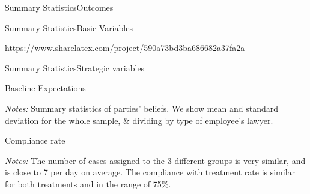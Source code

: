\documentclass[9pt]{beamer}
\begin{document}



\begin{frame}{Summary Statistics}{Outcomes}
  \begin{table}[H]
    \label{Sum_Stats_outcomes}
    \begin{center}
       \tiny{}
    \end{center}
\end{table}
\end{frame}

\begin{frame}{Summary Statistics}{Basic Variables}
  \begin{table}[H]
    \label{Sum_Stats_basic_variables}
    \begin{center}https://www.sharelatex.com/project/590a73bd3ba686682a37fa2a
       \tiny{}
    \end{center}
\end{table}
\end{frame}

\begin{frame}{Summary Statistics}{Strategic variables}
  \begin{table}[H]
    \label{Sum_Stats_strategic_variables}
    \begin{center}
       \tiny{}
    \end{center}
\end{table}
\end{frame}

\begin{frame}{Baseline Expectations}
\begin{table}[H]
    \label{Table_expectations}
    \begin{center}
       \scriptsize{}
    \end{center}
\end{table}
    \footnotesize    
    \textit{Notes:} 
    Summary statistics of parties' beliefs. We show mean and standard deviation for the whole sample, \& dividing by type of employee's lawyer.
\end{frame}



\begin{frame}{Compliance rate}
 \begin{table}[H]
  \resizebox{0.9\textwidth}{!}{\begin{minipage}{\textwidth}
\label{Table_compliance}
\begin{center}
\scriptsize{}
\end{center}
\end{minipage}}
\end{table}
 \footnotesize
\textit{Notes:} 
The number of cases assigned to the 3 different groups is very similar, and is close to 7 per day on average. The compliance with treatment rate is similar for both treatments and in the range of 75\%.
\end{frame}
\end{document}
